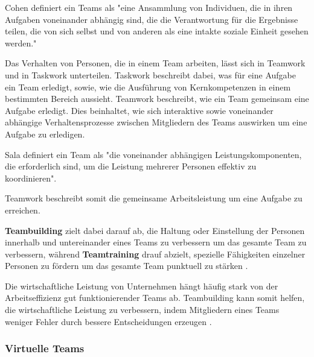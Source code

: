 \documentclass[a4paper,11pt]{article}%
\renewcommand{\\}{\vspace*{0.5\baselineskip} \newline}
\begin{document}
Cohen \citep[p.557]{cohen1997makes} definiert ein Teams als "eine Ansammlung von Individuen, die in ihren Aufgaben voneinander abhängig sind, die die Verantwortung für die Ergebnisse teilen, die von sich selbst und von anderen als eine intakte soziale Einheit gesehen werden."

Das Verhalten von Personen, die in einem Team arbeiten, lässt sich in \glqq Teamwork \grqq und in \glqq Taskwork \grqq unterteilen. \citep[p. 541-542]{rousseau2006teamwork}
Taskwork beschreibt dabei, was für eine Aufgabe ein Team erledigt, sowie, wie die Ausführung von Kernkompetenzen in einem bestimmten Bereich aussieht. 
Teamwork beschreibt, wie ein Team gemeinsam eine Aufgabe erledigt. Dies beinhaltet, wie sich interaktive sowie voneinander abhängige Verhaltensprozesse zwischen Mitgliedern des Teams auswirken um eine Aufgabe zu erledigen\citep[p. 357]{marks2001temporally}.

Sala \citep[p.541]{salas2008teams} definiert ein Team als "die voneinander abhängigen Leistungskomponenten, die erforderlich sind, um die Leistung mehrerer Personen effektiv zu koordinieren".

Teamwork beschreibt somit die gemeinsame Arbeitsleistung um eine Aufgabe zu erreichen.

\textbf{Teambuilding} zielt dabei darauf ab, die Haltung oder Einstellung der Personen innerhalb und untereinander eines Teams zu verbessern um das gesamte Team zu verbessern, während \textbf{Teamtraining} drauf abzielt, spezielle Fähigkeiten einzelner Personen zu fördern um das gesamte Team punktuell zu stärken \citep[p. 367-369]{shuffler2011there}.
		
Die wirtschaftliche Leistung von Unternehmen hängt häufig stark von der Arbeitseffizienz gut funktionierender Teams ab. Teambuilding kann somit helfen, die wirtschaftliche Leistung zu verbessern, indem Mitgliedern eines Teams weniger Fehler durch bessere Entscheidungen erzeugen \citep[p. 1-6]{biech2007pfeiffer}.

\subsubsection{Virtuelle Teams}
\label{vts}
\end{document}
